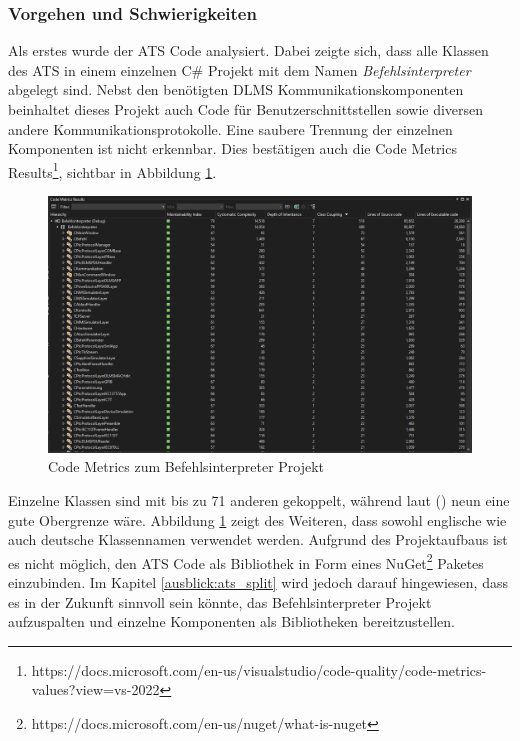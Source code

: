 \subsubsection{Vorgehen und Schwierigkeiten}\label{atsUmsetztung}
Als erstes wurde der ATS Code analysiert.
Dabei zeigte sich, dass alle Klassen des \ac{ATS} in einem einzelnen C\# Projekt mit dem Namen \textit{Befehlsinterpreter} abgelegt sind.
Nebst den benötigten \ac{DLMS} Kommunikationskomponenten beinhaltet dieses Projekt auch Code für Benutzerschnittstellen sowie diversen andere Kommunikationsprotokolle.
Eine saubere Trennung der einzelnen Komponenten ist nicht erkennbar. 
Dies bestätigen auch die Code Metrics Results\footnote{https://docs.microsoft.com/en-us/visualstudio/code-quality/code-metrics-values?view=vs-2022}, sichtbar in Abbildung \ref{fig:codemetrics}.
\begin{figure}[H]
   \centering
   \includegraphics[width=1.0\textwidth]{gfx/S1_CodeMetrics_Befehlsinterpreter.png}
   \caption{
      Code Metrics zum Befehlsinterpreter Projekt
      }
      \label{fig:codemetrics}
\end{figure}
Einzelne Klassen sind mit bis zu 71 anderen gekoppelt, während laut \citeauthor{quantitativeInvestigationRiskCodeMetrics} (\citeyear{quantitativeInvestigationRiskCodeMetrics}) neun eine gute Obergrenze wäre.
Abbildung \ref{fig:codemetrics} zeigt des Weiteren, dass sowohl englische wie auch deutsche Klassennamen verwendet werden.
Aufgrund des Projektaufbaus ist es nicht möglich, den \ac{ATS} Code als Bibliothek in Form eines NuGet\footnote{https://docs.microsoft.com/en-us/nuget/what-is-nuget} Paketes einzubinden.
Im Kapitel \ref{ausblick:ats_split} wird jedoch darauf hingewiesen, dass es in der Zukunft sinnvoll sein könnte,
das Befehlsinterpreter Projekt aufzuspalten und einzelne Komponenten als Bibliotheken bereitzustellen.

